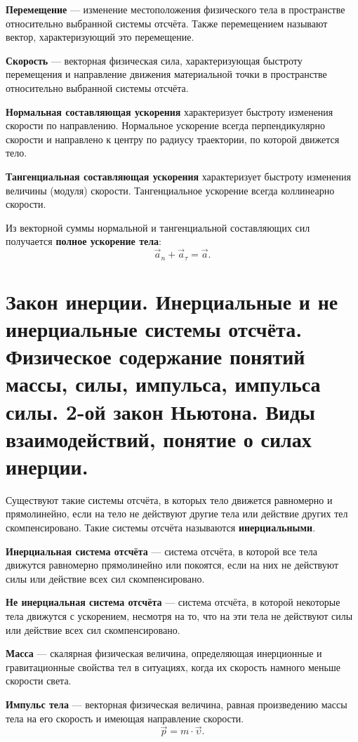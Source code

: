 \documentclass[10pt]{scrbook}
\begin{document}
\textbf{Перемещение} --- изменение местоположения физического тела в
пространстве относительно выбранной системы отсчёта. Также перемещением
называют вектор, характеризующий это перемещение.

\textbf{Скорость} --- векторная физическая сила, характеризующая быстроту
перемещения и направление движения материальной точки в пространстве
относительно выбранной системы отсчёта.

\textbf{Нормальная составляющая ускорения} характеризует быстроту изменения
скорости по направлению. Нормальное ускорение всегда перпендикулярно скорости и
направлено к центру по радиусу траектории, по которой движется тело.

\textbf{Тангенциальная составляющая ускорения} характеризует быстроту изменения
величины (модуля) скорости. Тангенциальное ускорение всегда коллинеарно
скорости.

Из векторной суммы нормальной и тангенциальной составляющих сил получается
\textbf{полное ускорение тела}: \[
	\vec{a}_n + \vec{a}_\tau = \vec{a}
	.\]

\section[второй вопрос]{Закон инерции. Инерциальные и не инерциальные системы
  отсчёта. Физическое содержание понятий массы, силы, импульса, импульса силы.
  2-ой закон Ньютона. Виды взаимодействий, понятие о силах инерции.}

Существуют такие системы отсчёта, в которых тело движется равномерно и
прямолинейно, если на тело не действуют другие тела или действие других тел
скомпенсировано. Такие системы отсчёта называются \textbf{инерциальными}.

\textbf{Инерциальная система отсчёта} --- система отсчёта, в которой все тела
движутся равномерно прямолинейно или покоятся, если на них не действуют силы
или действие всех сил скомпенсировано.

\textbf{Не инерциальная система отсчёта} --- система отсчёта, в которой
некоторые тела движутся с ускорением, несмотря на то, что на эти тела не
действуют силы или действие всех сил скомпенсировано.

\textbf{Масса} — скалярная физическая величина, определяющая инерционные и
гравитационные свойства тел в ситуациях, когда их скорость намного меньше
скорости света.

\textbf{Импульс тела} — векторная физическая величина, равная произведению
массы тела на его скорость и имеющая направление скорости. \[
	\vec{p} = m \cdot \vec{\upsilon}
	.\]
\end{document}
